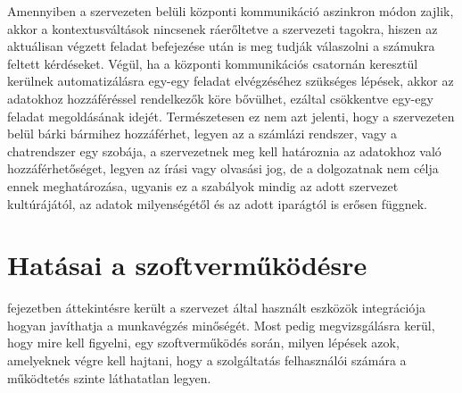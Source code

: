 Amennyiben a szervezeten belüli központi kommunikáció aszinkron módon zajlik, akkor a kontextusváltások nincsenek ráerőltetve a szervezeti tagokra, hiszen az aktuálisan végzett feladat befejezése után is meg tudják válaszolni a számukra feltett kérdéseket.
Végül, ha a központi kommunikációs csatornán keresztül kerülnek automatizálásra egy-egy feladat elvégzéséhez szükséges lépések, akkor az adatokhoz hozzáféréssel rendelkezők köre bővülhet, ezáltal csökkentve egy-egy feladat megoldásának idejét.
Természetesen ez nem azt jelenti, hogy a szervezeten belül bárki bármihez hozzáférhet, legyen az a számlázi rendszer, vagy a chatrendszer egy szobája, a szervezetnek meg kell határoznia az adatokhoz való hozzáférhetőséget, legyen az írási vagy olvasási jog, de a dolgozatnak nem célja ennek meghatározása, ugyanis ez a szabályok mindig az adott szervezet kultúrájától, az adatok milyenségétől és az adott iparágtól is erősen függnek.

\section{Hatásai a szoftverműködésre}
 fejezetben áttekintésre került a szervezet által használt eszközök integrációja hogyan javíthatja a munkavégzés minőségét. Most pedig megvizsgálásra kerül, hogy mire kell figyelni, egy szoftverműködés során, milyen lépések azok, amelyeknek végre kell hajtani, hogy a szolgáltatás felhasználói számára a működtetés szinte láthatatlan legyen.


